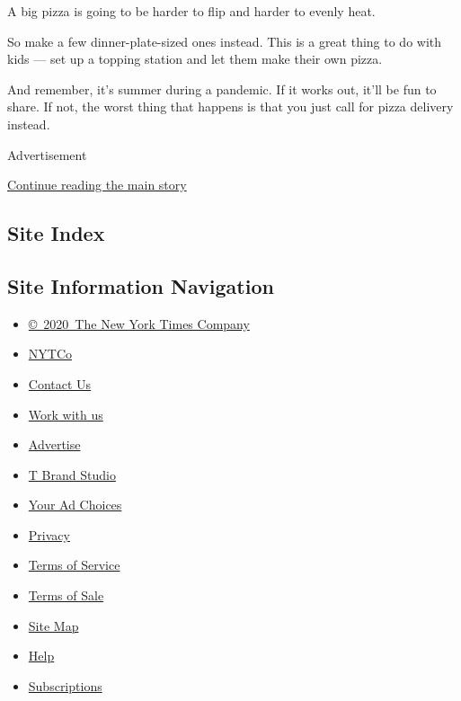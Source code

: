 A big pizza is going to be harder to flip and harder to evenly heat.

So make a few dinner-plate-sized ones instead. This is a great thing to
do with kids --- set up a topping station and let them make their own
pizza.

And remember, it's summer during a pandemic. If it works out, it'll be
fun to share. If not, the worst thing that happens is that you just call
for pizza delivery instead.

Advertisement

\protect\hyperlink{after-bottom}{Continue reading the main story}

\hypertarget{site-index}{%
\subsection{Site Index}\label{site-index}}

\hypertarget{site-information-navigation}{%
\subsection{Site Information
Navigation}\label{site-information-navigation}}

\begin{itemize}
\tightlist
\item
  \href{https://help.nytimes.com/hc/en-us/articles/115014792127-Copyright-notice}{©~2020~The
  New York Times Company}
\end{itemize}

\begin{itemize}
\tightlist
\item
  \href{https://www.nytco.com/}{NYTCo}
\item
  \href{https://help.nytimes.com/hc/en-us/articles/115015385887-Contact-Us}{Contact
  Us}
\item
  \href{https://www.nytco.com/careers/}{Work with us}
\item
  \href{https://nytmediakit.com/}{Advertise}
\item
  \href{http://www.tbrandstudio.com/}{T Brand Studio}
\item
  \href{https://www.nytimes.com/privacy/cookie-policy\#how-do-i-manage-trackers}{Your
  Ad Choices}
\item
  \href{https://www.nytimes.com/privacy}{Privacy}
\item
  \href{https://help.nytimes.com/hc/en-us/articles/115014893428-Terms-of-service}{Terms
  of Service}
\item
  \href{https://help.nytimes.com/hc/en-us/articles/115014893968-Terms-of-sale}{Terms
  of Sale}
\item
  \href{https://spiderbites.nytimes.com}{Site Map}
\item
  \href{https://help.nytimes.com/hc/en-us}{Help}
\item
  \href{https://www.nytimes.com/subscription?campaignId=37WXW}{Subscriptions}
\end{itemize}

